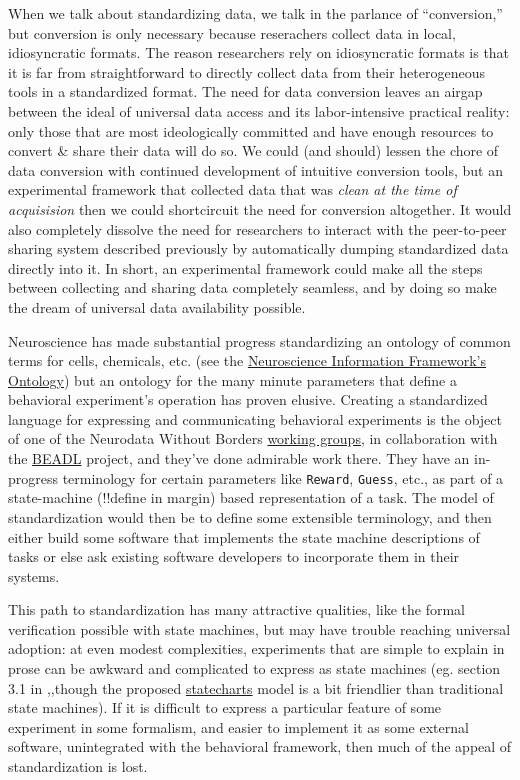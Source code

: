 \documentclass[nohyper]{tufte-book-jls}
\begin{document}
When we talk about standardizing data, we talk in the parlance of
``conversion,'' but conversion is only necessary because reserachers
collect data in local, idiosyncratic formats. The reason researchers
rely on idiosyncratic formats is that it is far from straightforward to
directly collect data from their heterogeneous tools in a standardized
format. The need for data conversion leaves an airgap between the ideal
of universal data access and its labor-intensive practical reality: only
those that are most ideologically committed and have enough resources to
convert \& share their data will do so. We could (and should) lessen the
chore of data conversion with continued development of intuitive
conversion tools, but an experimental framework that collected data that
was \emph{clean at the time of acquisision} then we could shortcircuit
the need for conversion altogether. It would also completely dissolve
the need for researchers to interact with the peer-to-peer sharing
system described previously by automatically dumping standardized data
directly into it. In short, an experimental framework could make all the
steps between collecting and sharing data completely seamless, and by
doing so make the dream of universal data availability possible.

Neuroscience has made substantial progress standardizing an ontology of
common terms for cells, chemicals, etc. (see the
\href{https://github.com/SciCrunch/NIF-Ontology}{Neuroscience
Information Framework's Ontology}) but an ontology for the many minute
parameters that define a behavioral experiment's operation has proven
elusive. Creating a standardized language for expressing and
communicating behavioral experiments is the object of one of the
Neurodata Without Borders
\href{https://archive.org/details/nwb-behavioral-task-wg}{working
groups}, in collaboration with the
\href{https://archive.org/details/beadl-xml-documentation-v-0.1}{BEADL}
project, and they've done admirable work there. They have an in-progress
terminology for certain parameters like \texttt{Reward}, \texttt{Guess},
etc., as part of a state-machine (!!define in margin) based
representation of a task. The model of standardization would then be to
define some extensible terminology, and then either build some software
that implements the state machine descriptions of tasks or else ask
existing software developers to incorporate them in their systems.

This path to standardization has many attractive qualities, like the
formal verification possible with state machines, but may have trouble
reaching universal adoption: at even modest complexities, experiments
that are simple to explain in prose can be awkward and complicated to
express as state machines (eg. section 3.1 in \cite{saundersAutopilotAutomatingBehavioral2019},,though the proposed
\href{https://statecharts.github.io/}{statecharts} model is a bit
friendlier than traditional state machines). If it is difficult to
express a particular feature of some experiment in some formalism, and
easier to implement it as some external software, unintegrated with the
behavioral framework, then much of the appeal of standardization is
lost.
\end{document}
